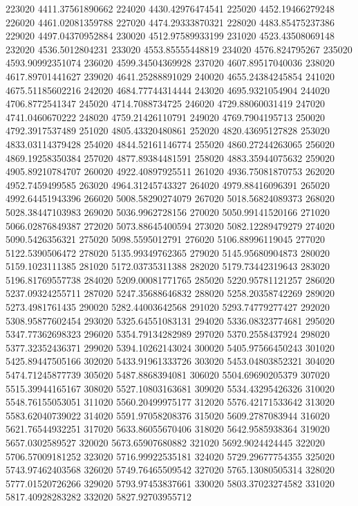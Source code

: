 {223020 4411.37561890662
224020 4430.42976474541
225020 4452.19466279248
226020 4461.02081359788
227020 4474.29333870321
228020 4483.85475237386
229020 4497.04370952884
230020 4512.97589933199
231020 4523.43508069148
232020 4536.5012804231
233020 4553.85555448819
234020 4576.824795267
235020 4593.90992351074
236020 4599.34504369928
237020 4607.89517040036
238020 4617.89701441627
239020 4641.25288891029
240020 4655.24384245854
241020 4675.51185602216
242020 4684.77744314444
243020 4695.9321054904
244020 4706.8772541347
245020 4714.7088734725
246020 4729.88060031419
247020 4741.0460670222
248020 4759.21426110791
249020 4769.7904195713
250020 4792.3917537489
251020 4805.43320480861
252020 4820.43695127828
253020 4833.03114379428
254020 4844.52161146774
255020 4860.27244263065
256020 4869.19258350384
257020 4877.89384481591
258020 4883.35944075632
259020 4905.89210784707
260020 4922.40897925511
261020 4936.75081870753
262020 4952.7459499585
263020 4964.31245743327
264020 4979.88416096391
265020 4992.64451943396
266020 5008.58290274079
267020 5018.56824089373
268020 5028.38447103983
269020 5036.9962728156
270020 5050.99141520166
271020 5066.02876849387
272020 5073.88645400594
273020 5082.12289479279
274020 5090.5426356321
275020 5098.5595012791
276020 5106.88996119045
277020 5122.5390506472
278020 5135.99349762365
279020 5145.95680904873
280020 5159.1023111385
281020 5172.03735311388
282020 5179.73442319643
283020 5196.81769557738
284020 5209.00081771765
285020 5220.95781121257
286020 5237.09324255711
287020 5247.35688646832
288020 5258.20358742269
289020 5273.4981761435
290020 5282.44003642568
291020 5293.74779277427
292020 5308.95877602454
293020 5325.64551083131
294020 5336.08323774681
295020 5347.77362698323
296020 5354.79134282989
297020 5370.2558437924
298020 5377.32352436371
299020 5394.10262143024
300020 5405.97566450243
301020 5425.89447505166
302020 5433.91961333726
303020 5453.04803852321
304020 5474.71245877739
305020 5487.8868394081
306020 5504.69690205379
307020 5515.39944165167
308020 5527.10803163681
309020 5534.43295426326
310020 5548.76155053051
311020 5560.20499975177
312020 5576.42171533642
313020 5583.62040739022
314020 5591.97058208376
315020 5609.2787083944
316020 5621.76544932251
317020 5633.86055670406
318020 5642.9585938364
319020 5657.0302589527
320020 5673.65907680882
321020 5692.9024424445
322020 5706.57009181252
323020 5716.99922535181
324020 5729.29677754355
325020 5743.97462403568
326020 5749.76465509542
327020 5765.13080505314
328020 5777.01520726266
329020 5793.97453837661
330020 5803.37023274582
331020 5817.40928283282
332020 5827.92703955712
}
